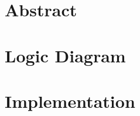 \documentclass[11pt]{article}
\begin{document}


\tableofcontents
\newpage
\section{Abstract}
\section{Logic Diagram}
\section{Implementation}
\end{document}
